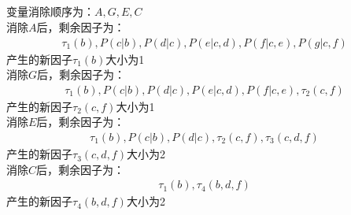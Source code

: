 \documentclass[12pt,a4paper]{article}
\begin{document}
\subsection{}
变量消除顺序为：$A,G,E,C$\\
消除$A$后，剩余因子为：
\begin{gather*}
    \tau_1(b), P(c|b),P(d|c),P(e|c,d),P(f|c,e),P(g|c,f)
\end{gather*}
产生的新因子$\tau_1(b)$大小为1\\
消除$G$后，剩余因子为：
\begin{gather*}
    \tau_1(b), P(c|b),P(d|c),P(e|c,d),P(f|c,e),\tau_2(c,f)
\end{gather*}
产生的新因子$\tau_2(c,f)$大小为1\\
消除$E$后，剩余因子为：
\begin{gather*}
    \tau_1(b), P(c|b),P(d|c),\tau_2(c,f),\tau_3(c,d,f)
\end{gather*}
产生的新因子$\tau_3(c,d,f)$大小为2\\
消除$C$后，剩余因子为：
\begin{gather*}
    \tau_1(b),\tau_4(b,d,f)
\end{gather*}
产生的新因子$\tau_4(b,d,f)$大小为2\\
\end{document}
